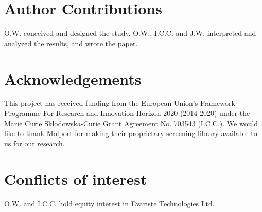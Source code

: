 \documentclass{article}
\begin{document}
\newpage
\section{Author Contributions}
O.W. conceived and designed the study. 
O.W., I.C.C. and J.W. interpreted and analyzed the results, and wrote the paper.

\section{Acknowledgements}
This project has received funding from the European Union’s Framework Programme For Research and Innovation Horizon 2020 (2014-2020) under the Marie Curie Sklodowska-Curie Grant Agreement No. 703543 (I.C.C.).
We would like to thank Molport for making their proprietary screening library available to us for our research.

\section{Conflicts of interest}
O.W. and I.C.C. hold equity interest in Evariste Technologies Ltd.

\newpage



\end{document}
